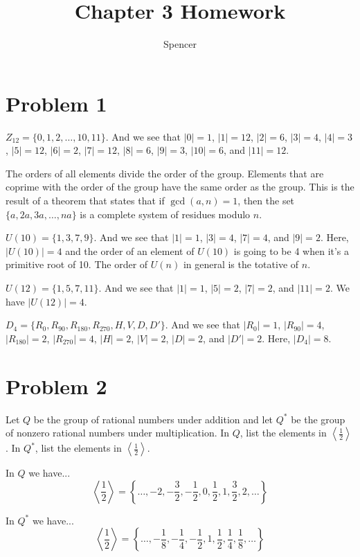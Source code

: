 \documentclass{article}
\title{Chapter 3 Homework}
\author{Spencer}
\begin{document}
\maketitle

\section*{Problem 1}

$Z_{12} = \{0,1,2,\dots,10,11\}$.
And we see that $|0| = 1$, $|1| = 12$, $|2| = 6$,
$|3| = 4$, $|4| = 3$, $|5| = 12$, $|6| = 2$,
$|7| = 12$, $|8| = 6$, $|9| = 3$, $|10| = 6$,
and $|11| = 12$.

The orders of all elements divide the order of the group.  Elements that are coprime with
the order of the group have the same order as the group.  This is the result of a theorem
that states that if $\gcd(a,n)=1$, then the set $\{a,2a,3a,\dots,na\}$ is a complete system
of residues modulo $n$.

$U(10)=\{1, 3, 7, 9\}$.  And we see that $|1|=1$, $|3|=4$, $|7|=4$, and $|9|=2$.
Here, $|U(10)|=4$ and the order of an element of $U(10)$ is going to be 4 when
it's a primitive root of 10.  The order of $U(n)$ in general is the totative of $n$.

$U(12)=\{1, 5, 7, 11\}$.  And we see that $|1|=1$, $|5|=2$, $|7|=2$, and $|11|=2$.
We have $|U(12)|=4$.

$D_4=\{R_0, R_{90}, R_{180}, R_{270}, H, V, D, D'\}$.  And we see that
$|R_0|=1$, $|R_{90}|=4$, $|R_{180}|=2$, $|R_{270}|=4$, $|H|=2$, $|V|=2$,
$|D|=2$, and $|D'|=2$.  Here, $|D_4|=8$.

\section*{Problem 2}

Let $Q$ be the group of rational numbers under addition and let $Q^{*}$ be the
group of nonzero rational numbers under multiplication.  In $Q$, list the
elements in $\left\langle\frac{1}{2}\right\rangle$.  In $Q^{*}$, list the elements
in $\left\langle\frac{1}{2}\right\rangle$.

In $Q$ we have...
\begin{equation*}
\left\langle\frac{1}{2}\right\rangle = \left\{\dots, -2, -\frac{3}{2}, -\frac{1}{2}, 0, \frac{1}{2}, 1, \frac{3}{2}, 2, \dots\right\}
\end{equation*}

In $Q^{*}$ we have...
\begin{equation*}
\left\langle\frac{1}{2}\right\rangle = \left\{ \dots, -\frac{1}{8}, -\frac{1}{4}, -\frac{1}{2}, 1, \frac{1}{2}, \frac{1}{4}, \frac{1}{8}, \dots \right\}
\end{equation*}
\end{document}
